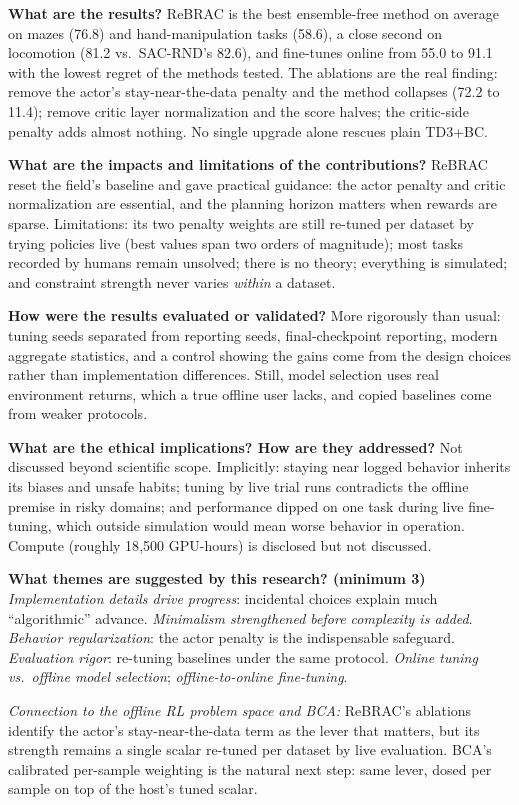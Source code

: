 \documentclass[11pt]{article}
\newcommand{\q}[2]{\item \textbf{#1} #2}
\newcommand{\tiein}[1]{\par\smallskip\noindent\emph{Connection to the offline RL problem space and BCA:} #1\par\medskip}
\begin{document}
\begin{qna}
\q{What are the results?}
ReBRAC is the best ensemble-free method on average on mazes (76.8) and hand-manipulation tasks (58.6), a close second on locomotion (81.2 vs.\ SAC-RND's 82.6), and fine-tunes online from 55.0 to 91.1 with the lowest regret of the methods tested. The ablations are the real finding: remove the actor's stay-near-the-data penalty and the method collapses (72.2 to 11.4); remove critic layer normalization and the score halves; the critic-side penalty adds almost nothing. No single upgrade alone rescues plain TD3+BC.

\q{What are the impacts and limitations of the contributions?}
ReBRAC reset the field's baseline and gave practical guidance: the actor penalty and critic normalization are essential, and the planning horizon matters when rewards are sparse. Limitations: its two penalty weights are still re-tuned per dataset by trying policies live (best values span two orders of magnitude); most tasks recorded by humans remain unsolved; there is no theory; everything is simulated; and constraint strength never varies \emph{within} a dataset.

\q{How were the results evaluated or validated?}
More rigorously than usual: tuning seeds separated from reporting seeds, final-checkpoint reporting, modern aggregate statistics, and a control showing the gains come from the design choices rather than implementation differences. Still, model selection uses real environment returns, which a true offline user lacks, and copied baselines come from weaker protocols.

\q{What are the ethical implications? How are they addressed?}
Not discussed beyond scientific scope. Implicitly: staying near logged behavior inherits its biases and unsafe habits; tuning by live trial runs contradicts the offline premise in risky domains; and performance dipped on one task during live fine-tuning, which outside simulation would mean worse behavior in operation. Compute (roughly 18{,}500 GPU-hours) is disclosed but not discussed.

\q{What themes are suggested by this research? (minimum 3)}
\emph{Implementation details drive progress}: incidental choices explain much ``algorithmic'' advance. \emph{Minimalism strengthened before complexity is added}. \emph{Behavior regularization}: the actor penalty is the indispensable safeguard. \emph{Evaluation rigor}: re-tuning baselines under the same protocol. \emph{Online tuning vs.\ offline model selection}; \emph{offline-to-online fine-tuning}.

\end{qna}
\tiein{ReBRAC's ablations identify the actor's stay-near-the-data term as the lever that matters, but its strength remains a single scalar re-tuned per dataset by live evaluation. BCA's calibrated per-sample weighting is the natural next step: same lever, dosed per sample on top of the host's tuned scalar.}
\end{document}

